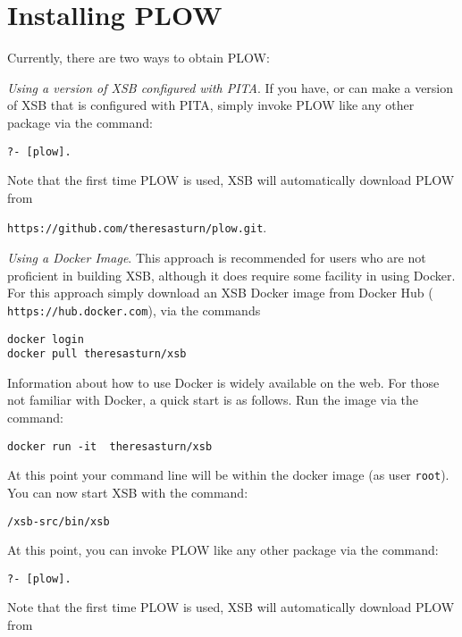 
\section{Installing PLOW}

Currently, there are two ways to obtain PLOW:

\bi
\item {\em Using a version of XSB configured with PITA}.  If you have,
  or can make a version of XSB that is configured with PITA, simply
  invoke PLOW like any other package via the command:

\begin{verbatim}
?- [plow].
\end{verbatim}

Note that the first time PLOW is used, XSB will automatically download
PLOW from

{\tt https://github.com/theresasturn/plow.git}.

\item {\em Using a Docker Image}.  This approach is recommended for
  users who are not proficient in building XSB, although it does
  require some facility in using Docker.  For this approach simply
  download an XSB Docker image from Docker Hub ({\tt
    https://hub.docker.com}), via the commands

\begin{verbatim}
docker login
docker pull theresasturn/xsb
\end{verbatim}

Information about how to use Docker is widely available on the web.
For those not familiar with Docker, a quick start is as follows.  Run
the image via the command:

\begin{verbatim}
docker run -it  theresasturn/xsb
\end{verbatim}

At this point your command line will be within the docker image (as
user {\tt root}).  You can now start XSB with the command:

\begin{verbatim}
/xsb-src/bin/xsb
\end{verbatim}

At this point, you can invoke PLOW like any other package via the
command:

\begin{verbatim}
?- [plow].
\end{verbatim}

Note that the first time PLOW is used, XSB will automatically download
PLOW from

